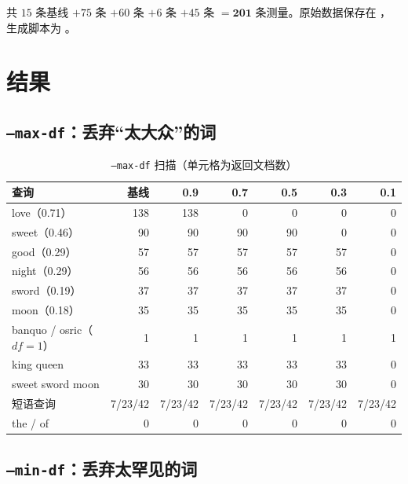 共 $15$ 条基线 $+75$ 条  $+60$ 条  $+6$ 条  $+45$ 条  $=\mathbf{201}$ 条测量。原始数据保存在 ，生成脚本为 。

\section{结果}

\subsection{\texttt{--max-df}：丢弃“太大众”的词}

\begin{table}[H]
  \centering
  \caption{\texttt{--max-df} 扫描（单元格为返回文档数）}
  \label{tab:max-df}
  \small
  \begin{tabularx}{\linewidth}{@{}X r r r r r r@{}}
    \toprule
    查询 & 基线 & 0.9 & 0.7 & 0.5 & 0.3 & 0.1 \\
    \midrule
    love（0.71） & 138 & 138 & 0 & 0 & 0 & 0 \\
    sweet（0.46） & 90 & 90 & 90 & 90 & 0 & 0 \\
    good（0.29） & 57 & 57 & 57 & 57 & 57 & 0 \\
    night（0.29） & 56 & 56 & 56 & 56 & 56 & 0 \\
    sword（0.19） & 37 & 37 & 37 & 37 & 37 & 0 \\
    moon（0.18） & 35 & 35 & 35 & 35 & 35 & 0 \\
    banquo / osric（$df=1$） & 1 & 1 & 1 & 1 & 1 & 1 \\
    king queen & 33 & 33 & 33 & 33 & 33 & 0 \\
    sweet sword moon & 30 & 30 & 30 & 30 & 30 & 0 \\
    短语查询 & 7/23/42 & 7/23/42 & 7/23/42 & 7/23/42 & 7/23/42 & 7/23/42 \\
    the / of & 0 & 0 & 0 & 0 & 0 & 0 \\
    \bottomrule
  \end{tabularx}
\end{table}

\subsection{\texttt{--min-df}：丢弃太罕见的词}

